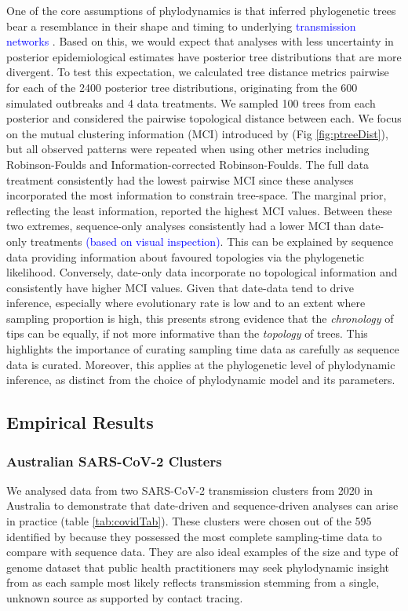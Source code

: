 \documentclass{article}
\begin{document}
One of the core assumptions of phylodynamics is that inferred phylogenetic trees bear a resemblance in their shape and timing to underlying \textcolor{blue}{transmission networks} \citep{featherstone_epidemiological_2022}. Based on this, we would expect that analyses with less uncertainty in posterior epidemiological estimates have posterior tree distributions that are more divergent. To test this expectation, we calculated tree distance metrics pairwise for each of the 2400 posterior tree distributions, originating from the 600 simulated outbreaks and 4 data treatments. We sampled 100 trees from each posterior and considered the pairwise topological distance between each. We focus on the mutual clustering information (MCI) introduced by \citet{smith_information_2020} (Fig \ref{fig:ptreeDist}), but all observed patterns were repeated when using other metrics including Robinson-Foulds and Information-corrected Robinson-Foulds. The full data treatment consistently had the lowest pairwise MCI since these analyses incorporated the most information to constrain tree-space. The marginal prior, reflecting the least information, reported the highest MCI values. Between these two extremes, sequence-only analyses consistently had a lower MCI than date-only treatments \textcolor{blue}{(based on visual inspection)}. This can be explained by sequence data providing information about favoured topologies via the phylogenetic likelihood. Conversely, date-only data incorporate no topological information and consistently have higher MCI values. Given that date-data tend to drive inference, especially where evolutionary rate is low and to an extent where sampling proportion is high, this presents strong evidence that the \textit{chronology} of tips can be equally, if not more informative than the \textit{topology} of trees. This highlights the importance of curating sampling time data as carefully as sequence data is curated. Moreover, this applies at the phylogenetic level of phylodynamic inference, as distinct from the choice of phylodynamic model and its parameters. 

\subsection*{Empirical Results}
\subsubsection*{Australian SARS-CoV-2 Clusters}
We analysed data from two SARS-CoV-2 transmission clusters from 2020 in Australia to demonstrate that date-driven and sequence-driven analyses can arise in practice (table \ref{tab:covidTab}). These clusters were chosen out of the 595 identified by \citet{lane2021genomics} because they possessed the most complete sampling-time data to compare with sequence data. They are also ideal examples of the size and type of genome dataset that public health practitioners may seek phylodynamic insight from as each sample most likely reflects transmission stemming from a single, unknown source as supported by contact tracing.
\end{document}
